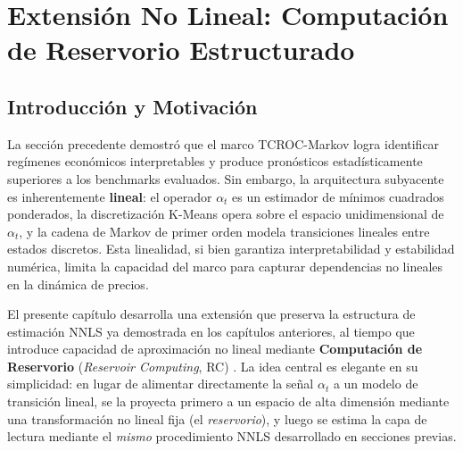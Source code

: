 \chapter{Extensión No Lineal: Computación de Reservorio Estructurado}
\label{cap:sec_ssrc}

\section{Introducción y Motivación}
\label{sec:ssrc_intro}

La sección precedente demostró que el marco TCROC-Markov logra
identificar regímenes económicos interpretables y produce pronósticos
estadísticamente superiores a los benchmarks evaluados.  Sin embargo,
la arquitectura subyacente es inherentemente \textbf{lineal}: el
operador $\alpha_t$ es un estimador de mínimos cuadrados ponderados, la discretización
K-Means opera sobre el espacio unidimensional de $\alpha_t$, y la
cadena de Markov de primer orden modela transiciones lineales entre
estados discretos.  Esta linealidad, si bien garantiza
interpretabilidad y estabilidad numérica, limita la capacidad del
marco para capturar dependencias no lineales en la dinámica de
precios.

El presente capítulo desarrolla una extensión que preserva la
estructura de estimación NNLS ya demostrada en los capítulos
anteriores, al tiempo que introduce capacidad de aproximación no
lineal mediante \textbf{Computación de Reservorio}
(\textit{Reservoir Computing}, RC) \cite{jaeger2001echo,
lukosevicius2009reservoir}.  La idea central es elegante en su
simplicidad: en lugar de alimentar directamente la señal $\alpha_t$
a un modelo de transición lineal, se la proyecta primero a un
espacio de alta dimensión mediante una transformación no lineal fija
(el \textit{reservorio}), y luego se estima la capa de lectura
mediante el \emph{mismo} procedimiento NNLS desarrollado en
secciones previas.

